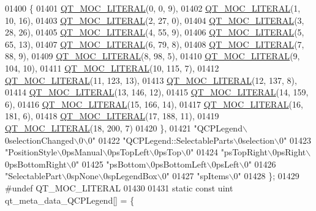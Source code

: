 \begin{DoxyCode}
01400     \{
01401 \hyperlink{a00016_a75bb9482d242cde0a06c9dbdc6b83abe}{QT\_MOC\_LITERAL}(0, 0, 9),
01402 \hyperlink{a00016_a75bb9482d242cde0a06c9dbdc6b83abe}{QT\_MOC\_LITERAL}(1, 10, 16),
01403 \hyperlink{a00016_a75bb9482d242cde0a06c9dbdc6b83abe}{QT\_MOC\_LITERAL}(2, 27, 0),
01404 \hyperlink{a00016_a75bb9482d242cde0a06c9dbdc6b83abe}{QT\_MOC\_LITERAL}(3, 28, 26),
01405 \hyperlink{a00016_a75bb9482d242cde0a06c9dbdc6b83abe}{QT\_MOC\_LITERAL}(4, 55, 9),
01406 \hyperlink{a00016_a75bb9482d242cde0a06c9dbdc6b83abe}{QT\_MOC\_LITERAL}(5, 65, 13),
01407 \hyperlink{a00016_a75bb9482d242cde0a06c9dbdc6b83abe}{QT\_MOC\_LITERAL}(6, 79, 8),
01408 \hyperlink{a00016_a75bb9482d242cde0a06c9dbdc6b83abe}{QT\_MOC\_LITERAL}(7, 88, 9),
01409 \hyperlink{a00016_a75bb9482d242cde0a06c9dbdc6b83abe}{QT\_MOC\_LITERAL}(8, 98, 5),
01410 \hyperlink{a00016_a75bb9482d242cde0a06c9dbdc6b83abe}{QT\_MOC\_LITERAL}(9, 104, 10),
01411 \hyperlink{a00016_a75bb9482d242cde0a06c9dbdc6b83abe}{QT\_MOC\_LITERAL}(10, 115, 7),
01412 \hyperlink{a00016_a75bb9482d242cde0a06c9dbdc6b83abe}{QT\_MOC\_LITERAL}(11, 123, 13),
01413 \hyperlink{a00016_a75bb9482d242cde0a06c9dbdc6b83abe}{QT\_MOC\_LITERAL}(12, 137, 8),
01414 \hyperlink{a00016_a75bb9482d242cde0a06c9dbdc6b83abe}{QT\_MOC\_LITERAL}(13, 146, 12),
01415 \hyperlink{a00016_a75bb9482d242cde0a06c9dbdc6b83abe}{QT\_MOC\_LITERAL}(14, 159, 6),
01416 \hyperlink{a00016_a75bb9482d242cde0a06c9dbdc6b83abe}{QT\_MOC\_LITERAL}(15, 166, 14),
01417 \hyperlink{a00016_a75bb9482d242cde0a06c9dbdc6b83abe}{QT\_MOC\_LITERAL}(16, 181, 6),
01418 \hyperlink{a00016_a75bb9482d242cde0a06c9dbdc6b83abe}{QT\_MOC\_LITERAL}(17, 188, 11),
01419 \hyperlink{a00016_a75bb9482d242cde0a06c9dbdc6b83abe}{QT\_MOC\_LITERAL}(18, 200, 7)
01420     \},
01421     \textcolor{stringliteral}{"QCPLegend\(\backslash\)0selectionChanged\(\backslash\)0\(\backslash\)0"}
01422     \textcolor{stringliteral}{"QCPLegend::SelectableParts\(\backslash\)0selection\(\backslash\)0"}
01423     \textcolor{stringliteral}{"PositionStyle\(\backslash\)0psManual\(\backslash\)0psTopLeft\(\backslash\)0psTop\(\backslash\)0"}
01424     \textcolor{stringliteral}{"psTopRight\(\backslash\)0psRight\(\backslash\)0psBottomRight\(\backslash\)0"}
01425     \textcolor{stringliteral}{"psBottom\(\backslash\)0psBottomLeft\(\backslash\)0psLeft\(\backslash\)0"}
01426     \textcolor{stringliteral}{"SelectablePart\(\backslash\)0spNone\(\backslash\)0spLegendBox\(\backslash\)0"}
01427     \textcolor{stringliteral}{"spItems\(\backslash\)0"}
01428 \};
01429 \textcolor{preprocessor}{#undef QT\_MOC\_LITERAL}
01430 
01431 \textcolor{keyword}{static} \textcolor{keyword}{const} uint qt\_meta\_data\_QCPLegend[] = \{

\end{DoxyCode}

